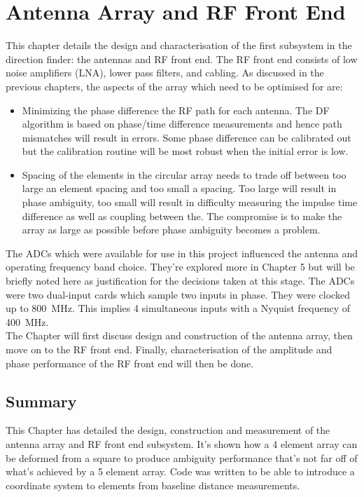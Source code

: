 \chapter{Antenna Array and RF Front End}
\label{ch:rf-front-end}
\graphicspath{{./img/rf-front-end/}}

This chapter details the design and characterisation of the first subsystem in the direction finder: the  antennas and RF front end. The RF front end consists of low noise amplifiers (LNA), lower pass filters, and cabling. As discussed in the previous chapters, the aspects of the array which need to be optimised for are:
\begin{itemize}
  \item Minimizing the phase difference the RF path for each antenna. The DF algorithm is based on phase/time difference measurements and hence path mismatches will result in errors. Some phase difference can be calibrated out but the calibration routine will be most robust when the initial error is low.
  \item Spacing of the elements in the circular array needs to trade off between too large an element spacing and too small a spacing. Too large will result in phase ambiguity, too small will result in difficulty measuring the impulse time difference as well as coupling between the. The compromise is to make the array as large as possible before phase ambiguity becomes a problem.
\end{itemize}

The ADCs which were available for use in this project influenced the antenna and operating frequency band choice. They're explored more in Chapter 5 but will be briefly noted here as justification for the decisions taken at this stage. The ADCs were two dual-input cards which sample two inputs in phase. They were clocked up to \SI{800}{\mega\hertz}. This implies 4 simultaneous inputs with a Nyquist frequency of \SI{400}{\mega\hertz}.\\

The Chapter will first discuss design and construction of the antenna array, then move on to the RF front end. Finally, characterisation of the amplitude and phase performance of the RF front end will then be done. 





\section{Summary}
This Chapter has detailed the design, construction and measurement of the antenna array and RF front end subsystem. It's shown how a 4 element array can be deformed from a square to produce ambiguity performance that's not far off of what's achieved by a 5 element array. Code was written to be able to introduce a coordinate system to elements from baseline distance measurements. 

